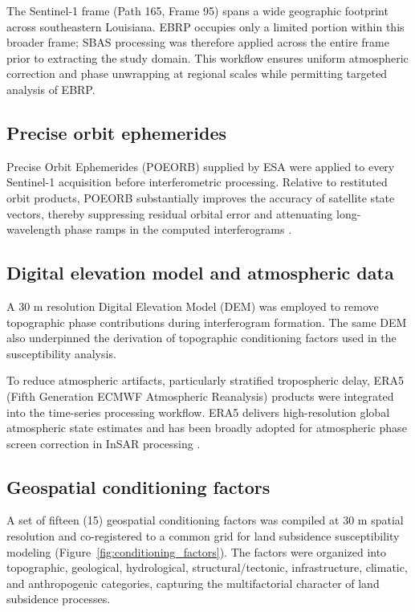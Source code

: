 \documentclass[oneside,doublespacing,flushright]{lsuthesis}
\begin{document}
The Sentinel-1 frame (Path 165, Frame 95) spans a wide geographic footprint across southeastern Louisiana. EBRP occupies only a limited portion within this broader frame; SBAS processing was therefore applied across the entire frame prior to extracting the study domain. This workflow ensures uniform atmospheric correction and phase unwrapping at regional scales while permitting targeted analysis of EBRP.

\subsection{Precise orbit ephemerides}
Precise Orbit Ephemerides (POEORB) supplied by ESA were applied to every Sentinel-1 acquisition before interferometric processing. Relative to restituted orbit products, POEORB substantially improves the accuracy of satellite state vectors, thereby suppressing residual orbital error and attenuating long-wavelength phase ramps in the computed interferograms \citep{Ferretti2001}.

\subsection{Digital elevation model and atmospheric data}
A 30 m resolution Digital Elevation Model (DEM) was employed to remove topographic phase contributions during interferogram formation. The same DEM also underpinned the derivation of topographic conditioning factors used in the susceptibility analysis.

To reduce atmospheric artifacts, particularly stratified tropospheric delay, ERA5 (Fifth Generation ECMWF Atmospheric Reanalysis) products were integrated into the time-series processing workflow. ERA5 delivers high-resolution global atmospheric state estimates and has been broadly adopted for atmospheric phase screen correction in InSAR processing \citep{HosseinzadehLLand2024}.

\subsection{Geospatial conditioning factors}
A set of fifteen (15) geospatial conditioning factors was compiled at 30 m spatial resolution and co-registered to a common grid for land subsidence susceptibility modeling (Figure~\ref{fig:conditioning_factors}). The factors were organized into topographic, geological, hydrological, structural/tectonic, infrastructure, climatic, and anthropogenic categories, capturing the multifactorial character of land subsidence processes.
\end{document}
